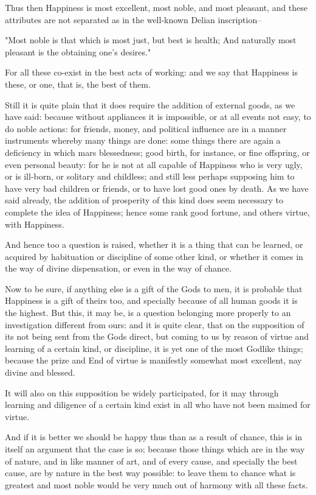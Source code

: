 Thus then Happiness is most excellent, most noble, and most pleasant,
and these attributes are not separated as in the well-known Delian
inscription--

"Most noble is that which is most just, but best is health; And
naturally most pleasant is the obtaining one's desires."

For all these co-exist in the best acts of working: and we say that
Happiness is these, or one, that is, the best of them.

Still it is quite plain that it does require the addition of external
goods, as we have said: because without appliances it is impossible, or
at all events not easy, to do noble actions: for friends, money, and
political influence are in a manner instruments whereby many things
are done: some things there are again a deficiency in which mars
blessedness; good birth, for instance, or fine offspring, or even
personal beauty: for he is not at all capable of Happiness who is very
ugly, or is ill-born, or solitary and childless; and still less perhaps
supposing him to have very bad children or friends, or to have lost good
ones by death. As we have said already, the addition of prosperity of
this kind does seem necessary to complete the idea of Happiness; hence
some rank good fortune, and others virtue, with Happiness.

And hence too a question is raised, whether it is a thing that can be
learned, or acquired by habituation or discipline of some other kind, or
whether it comes in the way of divine dispensation, or even in the way
of chance.

Now to be sure, if anything else is a gift of the Gods to men, it is
probable that Happiness is a gift of theirs too, and specially because
of all human goods it is the highest. But this, it may be, is a question
belonging more properly to an investigation different from ours: and it
is quite clear, that on the supposition of its not being sent from the
Gods direct, but coming to us by reason of virtue and learning of a
certain kind, or discipline, it is yet one of the most Godlike things;
because the prize and End of virtue is manifestly somewhat most
excellent, nay divine and blessed.

It will also on this supposition be widely participated, for it may
through learning and diligence of a certain kind exist in all who have
not been maimed for virtue.

And if it is better we should be happy thus than as a result of chance,
this is in itself an argument that the case is so; because those things
which are in the way of nature, and in like manner of art, and of every
cause, and specially the best cause, are by nature in the best way
possible: to leave them to chance what is greatest and most noble would
be very much out of harmony with all these facts.

